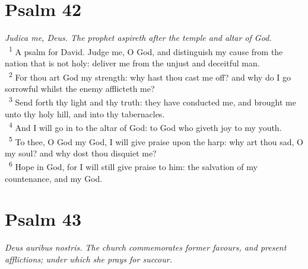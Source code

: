 \documentclass[a5paper,12pt]{article}
\begin{document}
\begin{multicols*}{2}
\section{Psalm 42}
\label{sec:org685221f}
\emph{Judica me, Deus. The prophet aspireth after the temple and altar of God.}\\

~\textsuperscript{1} A psalm for David. Judge me, O God, and distinguish my cause from the nation that is not holy: deliver me from the unjust and deceitful man.\\
~\textsuperscript{2} For thou art God my strength: why hast thou cast me off? and why do I go sorrowful whilst the enemy afflicteth me?\\
~\textsuperscript{3} Send forth thy light and thy truth: they have conducted me, and brought me unto thy holy hill, and into thy tabernacles.\\
~\textsuperscript{4} And I will go in to the altar of God: to God who giveth joy to my youth.\\
~\textsuperscript{5} To thee, O God my God, I will give praise upon the harp: why art thou sad, O my soul? and why dost thou disquiet me?\\
~\textsuperscript{6} Hope in God, for I will still give praise to him: the salvation of my countenance, and my God.\\

\section{Psalm 43}
\label{sec:org98ee329}
\emph{Deus auribus nostris. The church commemorates former favours, and present afflictions; under which she prays for succour.}\\


\end{multicols*}
\end{document}
